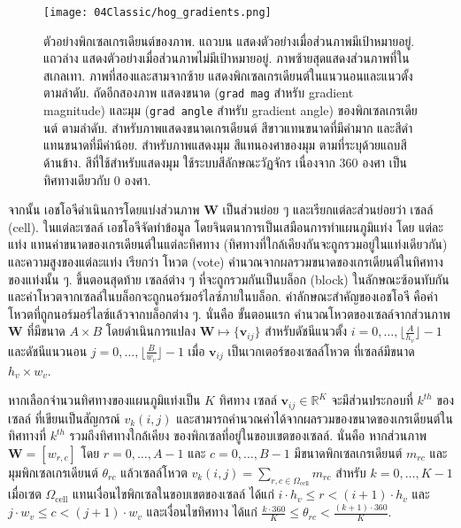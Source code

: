 %
\begin{figure}
	\begin{center}
		\texttt{[image: 04Classic/hog\_gradients.png]}
		\caption[เกรเดียนต์ของภาพ]{ตัวอย่างพิกเซลเกรเดียนต์ของภาพ.
แถวบน แสดงตัวอย่างเมื่อส่วนภาพมีเป้าหมายอยู่.
แถวล่าง แสดงตัวอย่างเมื่อส่วนภาพไม่มีเป้าหมายอยู่.
ภาพซ้ายสุดแสดงส่วนภาพที่ในสเกลเทา.
ภาพที่สองและสามจากซ้าย แสดงพิกเซลเกรเดียนต์ในแนวนอนและแนวตั้งตามลำดับ.
ถัดอีกสองภาพ แสดงขนาด (\texttt{grad mag} สำหรับ gradient magnitude) และมุม (\texttt{grad angle} สำหรับ gradient angle)
ของพิกเซลเกรเดียนต์ ตามลำดับ.
สำหรับภาพแสดงขนาดเกรเดียนต์ สีขาวแทนขนาดที่มีค่ามาก และสีดำแทนขนาดที่มีค่าน้อย.
สำหรับภาพแสดงมุม สีแทนองศาของมุม ตามที่ระบุด้วยแถบสีด้านข้าง.
สีที่ใช้สำหรับแสดงมุม ใช้ระบบสีลักษณะวัฏจักร เนื่องจาก $360$ องศา เป็นทิศทางเดียวกับ $0$ องศา.
		}
		\label{fig: hog gradient}
	\end{center}
\end{figure}
%

จากนั้น เอชโอจีดำเนินการโดยแบ่งส่วนภาพ $\bm{W}$ เป็นส่วนย่อย ๆ และเรียกแต่ละส่วนย่อยว่า เซลล์ (cell).
ในแต่ละเซลล์ เอชโอจีจัดทำข้อมูล โดยจินตนาการเป็นเสมือนการทำแผนภูมิแท่ง
โดย  แต่ละแท่ง แทนค่าขนาดของเกรเดียนต์ในแต่ละทิศทาง (ทิศทางที่ใกล้เคียงกันจะถูกรวมอยู่ในแท่งเดียวกัน)
และความสูงของแต่ละแท่ง เรียกว่า โหวต (vote) คำนวณจากผลรวมขนาดของเกรเดียนต์ในทิศทางของแท่งนั้น ๆ.
ขึ้นตอนสุดท้าย เซลล์ต่าง ๆ ที่จะถูกรวมกันเป็นบล็อก (block) ในลักษณะซ้อนทับกัน
และค่าโหวตจากเซลล์ในบล็อกจะถูกนอร์มอร์ไลซ์ภายในบล็อก.
ค่าลักษณะสำคัญของเอชโอจี คือค่าโหวตที่ถูกนอร์มอร์ไลซ์แล้วจากบล็อกต่าง ๆ.
นั่นคือ
ขั้นตอนแรก คำนวณโหวตของเซลล์จากส่วนภาพ $\bm{W}$ ที่มีขนาด $A \times B$ 
โดยดำเนินการแปลง
$\bm{W} \mapsto \{\bm{v}_{ij}\}$ 
สำหรับดัชนีแนวตั้ง $i = 0, \ldots, \lfloor \frac{A}{h_v} \rfloor - 1$
และดัชนีแนวนอน  $j = 0, \ldots, \lfloor \frac{B}{w_v} \rfloor - 1$
เมื่อ $\bm{v}_{ij}$ เป็นเวกเตอร์ของเซลล์โหวต ที่เซลล์มีขนาด $h_v \times w_v$.

หากเลือกจำนวนทิศทางของแผนภูมิแท่งเป็น $K$ ทิศทาง 
เซลล์ $\bm{v}_{ij} \in \mathbb{R}^K$ จะมีส่วนประกอบที่ $k^{th}$ ของเซลล์ ที่เขียนเป็นสัญกรณ์ $v_k(i,j)$
และสามารถคำนวณค่าได้จากผลรวมของขนาดของเกรเดียนต์ในทิศทางที่ $k^{th}$ รวมถึงทิศทางใกล้เคียง ของพิกเซลที่อยู่ในขอบเขตของเซลล์.
นั่นคือ
หากส่วนภาพ $\bm{W} = [w_{r,c}]$ โดย $r = 0, \ldots, A-1$ และ $c = 0, \ldots, B-1$
มีขนาดพิกเซลเกรเดียนต์ $m_{rc}$ และมุมพิกเซลเกรเดียนต์ $\theta_{rc}$ 
แล้วเซลล์โหวต
$v_k(i,j) = \sum_{r,c \in \Omega_{\mathrm{cell}}} m_{rc}$
สำหรับ $k = 0, \ldots, K-1$
เมื่อเซต $\Omega_{\mathrm{cell}}$
แทนเงื่อนไขพิกเซลในขอบเขตของเซลล์ ได้แก่
$i \cdot h_v \leq r < (i+1) \cdot h_v$
และ $j \cdot w_v \leq c < (j+1) \cdot w_v$
และเงื่อนไขทิศทาง ได้แก่
$\frac{k \cdot 360}{K} \leq \theta_{rc} < \frac{(k+1) \cdot 360}{K}$.

